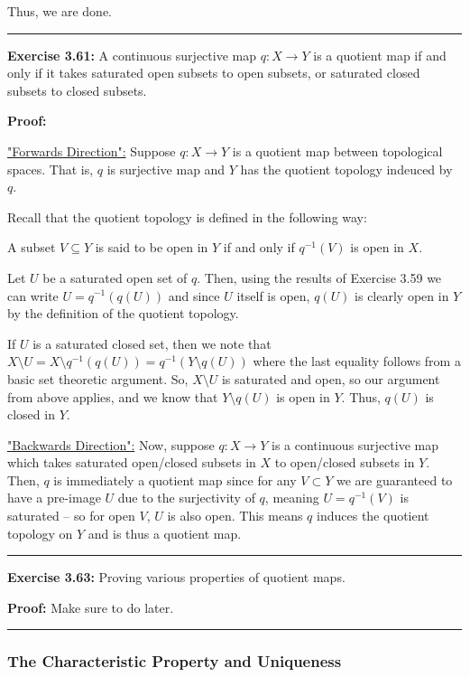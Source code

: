 \documentclass{article}
\begin{document}
Thus, we are done.

\vskip 0.5cm
\hrule
\vskip 0.5cm

\textbf{Exercise 3.61:} A continuous surjective map $q : X \rightarrow Y$ is a quotient map if and only if it takes saturated open subsets to open subsets, or saturated closed subsets to closed subsets.

\vskip 0.5cm

\textbf{Proof:} 

\underline{"Forwards Direction":} Suppose $q : X \rightarrow Y$ is a quotient map between topological spaces. That is, $q$ is surjective map and $Y$ has the quotient topology indeuced by $q$. 

\vskip 0.5cm
Recall that the quotient topology is defined in the following way:

A subset $V \subseteq Y$ is said to be open in $Y$ if and only if $q^{-1}(V)$ is open in $X$.

\vskip 0.5cm
Let $U$ be a saturated open set of $q$. Then, using the results of Exercise 3.59 we can write $U = q^{-1}(q(U))$ and since $U$ itself is open, $q(U)$ is clearly open in $Y$ by the definition of the quotient topology. 

\vskip 0.5cm
If $U$ is a saturated closed set, then we note that $X \setminus U = X \setminus q^{-1}(q(U)) = q^{-1}(Y \setminus q(U))$ where the last equality follows from a basic set theoretic argument.
So, $X \setminus U$ is saturated and open, so our argument from above applies, and we know that $Y \setminus q(U)$ is open in  $Y$. Thus, $q(U)$ is closed in $Y$.

\vskip 0.5cm
\underline{"Backwards Direction":}
Now, suppose $q : X \rightarrow Y$ is a continuous surjective map which takes saturated open/closed subsets in $X$ to open/closed subsets in $Y$. Then, $q$ is immediately a quotient map since for any $V \subset Y$ we are guaranteed to have a pre-image $U$ due to the surjectivity of $q$, meaning $U = q^{-1}(V)$ is saturated -- so for open $V$, $U$ is also open. This means $q$ induces the quotient topology on $Y$ and is thus a quotient map.

\vskip 0.5cm
\hrule
\vskip 0.5cm

\textbf{Exercise 3.63:} Proving various properties of quotient maps.

\vskip 0.5cm

\textbf{Proof:} Make sure to do later.

\vskip 0.5cm
\hrule
\vskip 0.5cm

\subsubsection{The Characteristic Property and Uniqueness}
\end{document}
